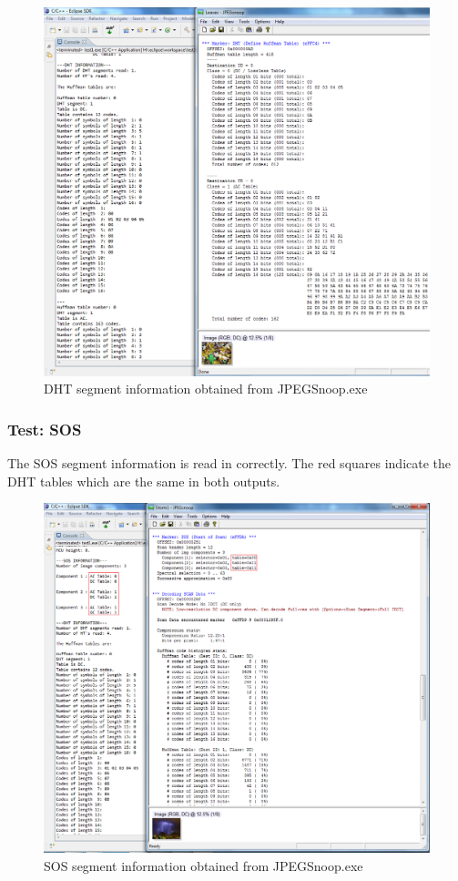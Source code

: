 \newpage

\begin{figure}[!hbtp]
\label{LeavesImage}
\begin{center}
\includegraphics[scale=0.5]{figures/jpegDHTtest1.png} 
\end{center}
\caption{DHT segment information obtained from JPEGSnoop.exe}
\end{figure}

\subsubsection{Test: SOS}

The SOS segment information is read in correctly. The red squares indicate
the DHT tables which are the same in both outputs.

\newpage

\begin{figure}[!hbtp]
\begin{center}
\includegraphics[scale=0.5]{figures/jpegSOStest.png} 
\end{center}
\caption{SOS segment information obtained from JPEGSnoop.exe}
\end{figure}